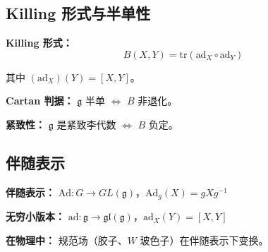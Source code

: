 \subsection{Killing 形式与半单性}

\textbf{Killing 形式：}
\[
B(X, Y) = \text{tr}(\text{ad}_X \circ \text{ad}_Y)
\]

其中 $(\text{ad}_X)(Y) = [X, Y]$。

\textbf{Cartan 判据：} $\mathfrak{g}$ 半单 $\iff$ $B$ 非退化。

\textbf{紧致性：} $\mathfrak{g}$ 是紧致李代数 $\iff$ $B$ 负定。

\subsection{伴随表示}

\textbf{伴随表示：} $\text{Ad}: G \to GL(\mathfrak{g})$，$\text{Ad}_g(X) = gXg^{-1}$

\textbf{无穷小版本：} $\text{ad}: \mathfrak{g} \to \mathfrak{gl}(\mathfrak{g})$，$\text{ad}_X(Y) = [X, Y]$

\textbf{在物理中：} 规范场（胶子、$W$ 玻色子）在伴随表示下变换。